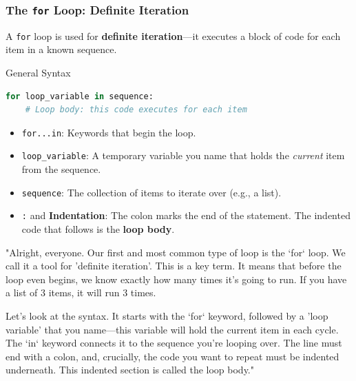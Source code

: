 \documentclass{beamer}
\begin{document}
\begin{frame}[fragile]
    \frametitle{The \texttt{for} Loop: Definite Iteration}
    A \texttt{for} loop is used for \textbf{definite iteration}—it executes a block of code for each item in a known sequence.
    \vspace{1em}

    \begin{block}{General Syntax}
        \begin{lstlisting}[language=Python]
for loop_variable in sequence:
    # Loop body: this code executes for each item
        \end{lstlisting}
    \end{block}
    
    \begin{itemize}
        \item \texttt{for...in}: Keywords that begin the loop.
        \item \texttt{loop\_variable}: A temporary variable you name that holds the \textit{current} item from the sequence.
        \item \texttt{sequence}: The collection of items to iterate over (e.g., a list).
        \item \texttt{:} and \textbf{Indentation}: The colon marks the end of the statement. The indented code that follows is the \textbf{loop body}.
    \end{itemize}

    \begin{note}
    "Alright, everyone. Our first and most common type of loop is the `for` loop. We call it a tool for 'definite iteration'. This is a key term. It means that before the loop even begins, we know exactly how many times it's going to run. If you have a list of 3 items, it will run 3 times.

    Let's look at the syntax. It starts with the `for` keyword, followed by a 'loop variable' that you name—this variable will hold the current item in each cycle. The `in` keyword connects it to the sequence you're looping over. The line must end with a colon, and, crucially, the code you want to repeat must be indented underneath. This indented section is called the loop body."
    \end{note}
\end{frame}
\end{document}
